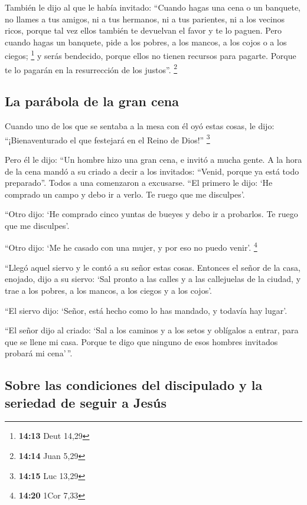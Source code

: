  También le dijo al que le había invitado: ``Cuando hagas
una cena o un banquete, no llames a tus amigos, ni a tus hermanos, ni a
tus parientes, ni a los vecinos ricos, porque tal vez ellos también te
devuelvan el favor y te lo paguen.  Pero cuando hagas un
banquete, pide a los pobres, a los mancos, a los cojos o a los ciegos;
\footnote{\textbf{14:13} Deut 14,29}  y serás bendecido,
porque ellos no tienen recursos para pagarte. Porque te lo pagarán en la
resurrección de los justos''. \footnote{\textbf{14:14} Juan 5,29}

\hypertarget{la-paruxe1bola-de-la-gran-cena}{%
\subsection{La parábola de la gran
cena}\label{la-paruxe1bola-de-la-gran-cena}}

 Cuando uno de los que se sentaba a la mesa con él oyó
estas cosas, le dijo: ``¡Bienaventurado el que festejará en el Reino de
Dios!'' \footnote{\textbf{14:15} Luc 13,29}

 Pero él le dijo: ``Un hombre hizo una gran cena, e
invitó a mucha gente.  A la hora de la cena mandó a su
criado a decir a los invitados: ``Venid, porque ya está todo
preparado''.  Todos a una comenzaron a excusarse. ``El
primero le dijo: `He comprado un campo y debo ir a verlo. Te ruego que
me disculpes'.

 ``Otro dijo: `He comprado cinco yuntas de bueyes y debo
ir a probarlos. Te ruego que me disculpes'.

 ``Otro dijo: `Me he casado con una mujer, y por eso no
puedo venir'. \footnote{\textbf{14:20} 1Cor 7,33}

 ``Llegó aquel siervo y le contó a su señor estas cosas.
Entonces el señor de la casa, enojado, dijo a su siervo: `Sal pronto a
las calles y a las callejuelas de la ciudad, y trae a los pobres, a los
mancos, a los ciegos y a los cojos'.

 ``El siervo dijo: `Señor, está hecho como lo has
mandado, y todavía hay lugar'.

 ``El señor dijo al criado: `Sal a los caminos y a los
setos y oblígalos a entrar, para que se llene mi casa. 
Porque te digo que ninguno de esos hombres invitados probará mi
cena'\,''.

\hypertarget{sobre-las-condiciones-del-discipulado-y-la-seriedad-de-seguir-a-jesuxfas}{%
\subsection{Sobre las condiciones del discipulado y la seriedad de
seguir a
Jesús}\label{sobre-las-condiciones-del-discipulado-y-la-seriedad-de-seguir-a-jesuxfas}}

